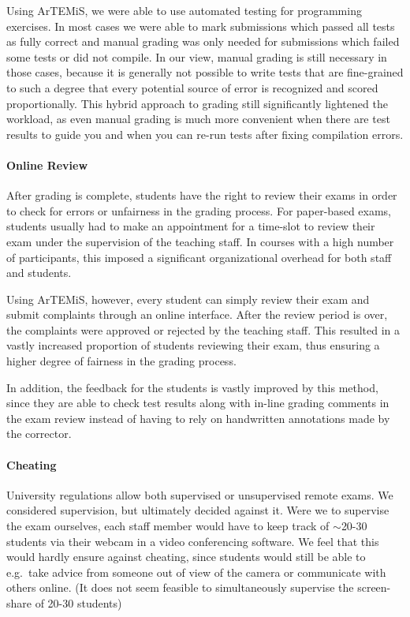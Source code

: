 Using ArTEMiS, we were able to use automated testing for programming exercises. In most cases we were able to mark submissions which passed all tests as fully correct and manual grading was only needed for submissions which failed some tests or did not compile. In our view, manual grading is still necessary in those cases, because it is generally not possible to write tests that are fine-grained to such a degree that every potential source of error is recognized and scored proportionally. This hybrid approach to grading still significantly lightened the workload, as even manual grading is much more convenient when there are test results to guide you and when you can re-run tests after fixing compilation errors.

\paragraph{Online Review}

After grading is complete, students have the right to review their exams in order to check for errors or unfairness in the grading process. For paper-based exams, students usually had to make an appointment for a time-slot to review their exam under the supervision of the teaching staff. In courses with a high number of participants, this imposed a significant organizational overhead for both staff and students.

Using ArTEMiS, however, every student can simply review their exam and submit complaints through an online interface. After the review period is over, the complaints were approved or rejected by the teaching staff. This resulted in a vastly increased proportion of students reviewing their exam, thus ensuring a higher degree of fairness in the grading process.

In addition, the feedback for the students is vastly improved by this method, since they are able to check test results along with in-line grading comments in the exam review instead of having to rely on handwritten annotations made by the corrector.

\paragraph{Cheating}

University regulations allow both supervised or unsupervised remote exams. We considered supervision, but ultimately decided against it. Were we to supervise the exam ourselves, each staff member would have to keep track of $\sim$20-30 students via their webcam in a video conferencing software. We feel that this would hardly ensure against cheating, since students would still be able to e.g.\ take advice from someone out of view of the camera or communicate with others online. (It does not seem feasible to simultaneously supervise the screen-share of 20-30 students)


